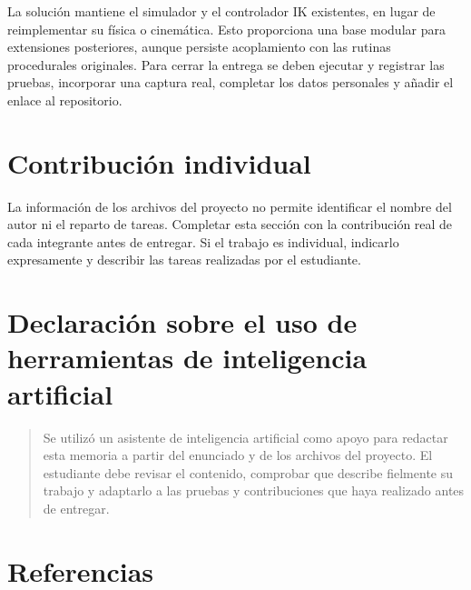 \documentclass[12pt,a4paper]{article}
\begin{document}
La solución mantiene el simulador y el controlador IK existentes, en lugar de
reimplementar su física o cinemática. Esto proporciona una base modular para
extensiones posteriores, aunque persiste acoplamiento con las rutinas
procedurales originales. Para cerrar la entrega se deben ejecutar y registrar
las pruebas, incorporar una captura real, completar los datos personales y
añadir el enlace al repositorio.


\section{Contribución individual}

La información de los archivos del proyecto no permite identificar el nombre
del autor ni el reparto de tareas. Completar esta sección con la contribución
real de cada integrante antes de entregar. Si el trabajo es individual,
indicarlo expresamente y describir las tareas realizadas por el estudiante.


\section{Declaración sobre el uso de herramientas de inteligencia artificial}

\begin{quote}
Se utilizó un asistente de inteligencia artificial como apoyo para redactar esta
memoria a partir del enunciado y de los archivos del proyecto. El estudiante
debe revisar el contenido, comprobar que describe fielmente su trabajo y
adaptarlo a las pruebas y contribuciones que haya realizado antes de entregar.
\end{quote}


\section{Referencias}
\end{document}
